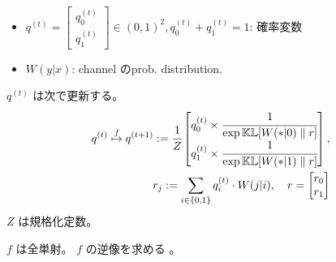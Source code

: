 \begin{itemize}

	\item $ q^{(t)} = \begin{bmatrix} q_0^{(t)} \\ q_1^{(t)} \end{bmatrix} 
			\in (0,1)^2 , q_0^{(t)} + q_1^{(t)} = 1$: 確率変数
	\item $W (y | x)$: channel のprob. distribution.
\end{itemize}

$q^{(t)}$ は次で更新する。
\begin{align}
	q^{(t)} \overset{f}{\mapsto}
	q^{(t+1)} := \cfrac{1}{Z} \begin{bmatrix}
		q_0^{(t)} \times \cfrac{1}{\exp  \mathbb{KL} [W (\ast | 0) \parallel r ]} \\
		q_1^{(t)} \times \cfrac{1}{\exp \mathbb{KL} [W (\ast | 1) \parallel r]}
	\end{bmatrix}
	,\\
	r_j := \sum_{i\in\{0,1\}} q^{(t)}_i \cdot W (j | i),
	\quad
	r = \begin{bmatrix} r_0 \\ r_1 \end{bmatrix}
\end{align}
$Z$ は規格化定数。

$f$ は全単射。
$f$ の逆像を求める
。


